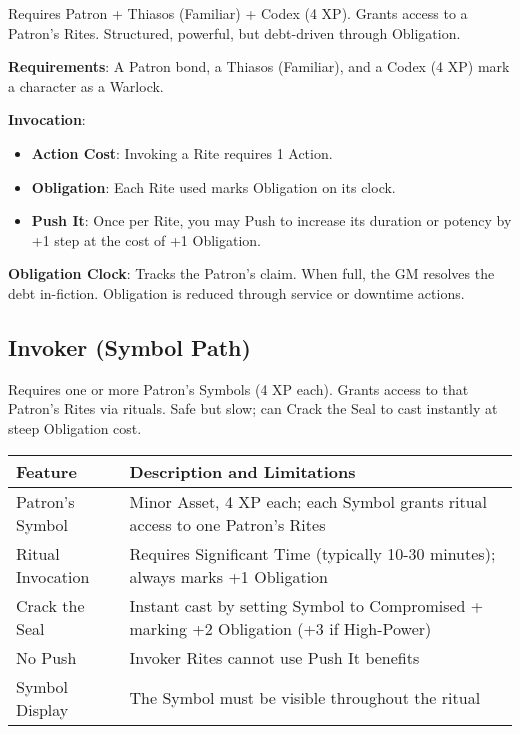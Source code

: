 Requires Patron + Thiasos (Familiar) + Codex (4 XP). Grants access to a Patron's Rites. Structured, powerful, but debt-driven through Obligation.

\textbf{Requirements}: A Patron bond, a Thiasos (Familiar), and a Codex (4 XP) mark a character as a Warlock.

\textbf{Invocation}:
\begin{itemize}
    \item \textbf{Action Cost}: Invoking a Rite requires 1 Action.
    \item \textbf{Obligation}: Each Rite used marks Obligation on its clock.
    \item \textbf{Push It}: Once per Rite, you may Push to increase its duration or potency by +1 step at the cost of +1 Obligation.
\end{itemize}

\textbf{Obligation Clock}: Tracks the Patron's claim. When full, the GM resolves the debt in-fiction. Obligation is reduced through service or downtime actions.

\subsection*{Invoker (Symbol Path)}

Requires one or more Patron's Symbols (4 XP each). Grants access to that Patron's Rites via rituals. Safe but slow; can Crack the Seal to cast instantly at steep Obligation cost.

\begin{fatebox}
\begin{tabularx}{\textwidth}{lX}
\toprule
\textbf{Feature} & \textbf{Description and Limitations} \\
\midrule
Patron's Symbol & Minor Asset, 4 XP each; each Symbol grants ritual access to one Patron's Rites \\
Ritual Invocation & Requires Significant Time (typically 10-30 minutes); always marks +1 Obligation \\
Crack the Seal & Instant cast by setting Symbol to Compromised + marking +2 Obligation (+3 if High-Power) \\
No Push & Invoker Rites cannot use Push It benefits \\
Symbol Display & The Symbol must be visible throughout the ritual \\
\bottomrule
\end{tabularx}
\end{fatebox}

